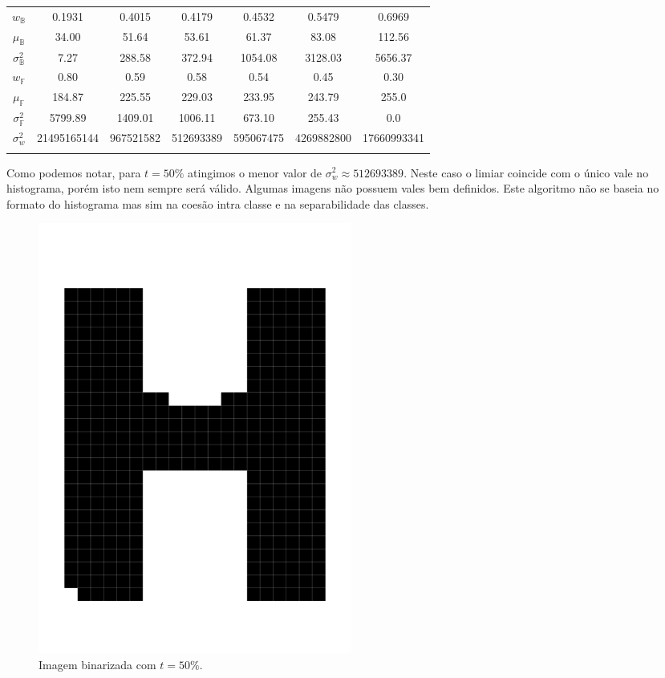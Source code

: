 \documentclass[a4paper,11pt]{article}
\begin{document}
\begin{center}
\begin{tabular}[p]{@{}ccccccc@{}}
        \\
        $w_\mathbb{B}$ & 0.1931 & 0.4015 & 0.4179 & 0.4532 & 0.5479 & 0.6969 \\

        $\mu_\mathbb{B}$ & 34.00 & 51.64 & 53.61 & 61.37 & 83.08 & 112.56 \\

        $\sigma^{2}_{\mathbb{B}}$ & 7.27 & 288.58 & 372.94 & 1054.08 & 3128.03 & 5656.37 \\

        $w_{\mathbb{F}}$ & 0.80 & 0.59 & 0.58 & 0.54 & 0.45 & 0.30 \\

        $\mu_{\mathbb{F}}$ & 184.87 & 225.55 & 229.03 & 233.95 & 243.79 & 255.0 \\

        $\sigma^{2}_{\mathbb{F}}$ & 5799.89 & 1409.01 & 1006.11 & 673.10 & 255.43 & 0.0 \\

        $\sigma^{2}_{w}$ & 21495165144 & 967521582 & 512693389 & 595067475 & 4269882800 & 17660993341 \\

        \label{tab:otsu}
      \end{tabular}
      \end{center}

      Como podemos notar, para $t = 50\%$ atingimos o menor valor de $\sigma^{2}_{w} \approx 512693389$. Neste caso o limiar coincide com o único vale no histograma, porém isto nem sempre será válido. Algumas imagens não possuem vales bem definidos. Este algoritmo não se baseia no formato do histograma mas sim na coesão intra classe e na separabilidade das classes.

      \begin{figure}[htb]
        \begin{center}
          \includegraphics[width=0.5\textwidth]{assets/binarization/bin_big.png}
          \end{center}
        \caption{Imagem binarizada com $t = 50\%.$}
        \label{fig:letrah_bin}
      \end{figure}
\end{document}
